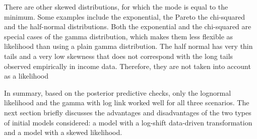 There are other skewed distributions, for which the mode is equal to the minimum.
Some examples include the exponential, the Pareto the chi-squared and the half-normal distributions.
Both the exponential and the chi-squared are special cases of the gamma distribution, which makes them less flexible as likelihood than using a plain gamma distribution.
The half normal has very thin tails and a very low skewness that does not correspond with the long tails observed empirically in income data.
Therefore, they are not taken into account as a likelihood

In summary, based on the posterior predictive checks, only the lognormal likelihood and the gamma with log link worked well for all three scenarios. The next section briefly discusses the advantages and disadvantages of the two types of initial models considered: a model with a log-shift data-driven transformation and a model with a skewed likelihood.


